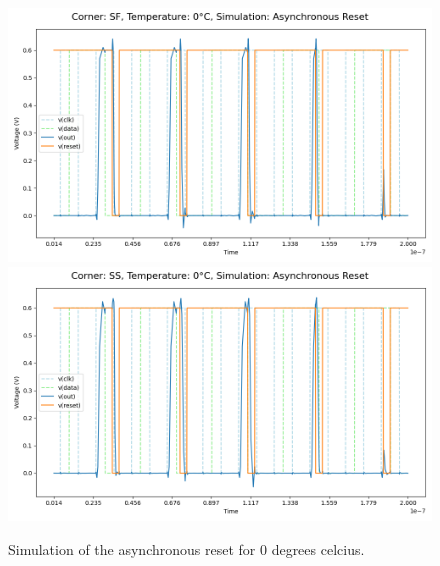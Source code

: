 \begin{figure}[H]
    \vspace{5pt}
    \includegraphics[height= 0.21\textheight]{figures/aimspice/SF/0/W2.csv.png}
    \vspace{5pt}
    \includegraphics[height= 0.21\textheight]{figures/aimspice/SS/0/W2.csv.png}
    \caption{Simulation of the asynchronous reset for 0 degrees celcius.}
    \label{fig:aimspice_W2_0}
\end{figure}

\pagebreak

